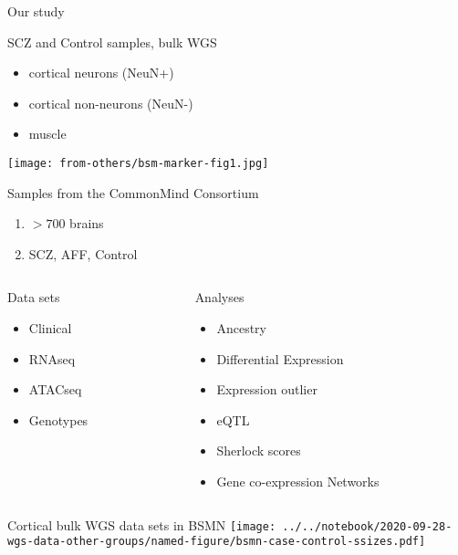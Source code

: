 \documentclass{beamer}
\begin{document}

\begin{frame}{Our study}
\item SCZ and Control samples, bulk WGS
	\begin{itemize}
		\item cortical neurons (NeuN+)
                \item cortical non-neurons (NeuN-)
                \item muscle
	\end{itemize}
\texttt{[image: from-others/bsm-marker-fig1.jpg]}
\end{frame}

\begin{frame}{Samples from the CommonMind Consortium}
\begin{enumerate}
\item \(> 700\) brains
\item SCZ, AFF, Control
\end{enumerate}
\vfill
\begin{columns}[t]
\begin{column}{0.5\textwidth}
Data sets
\begin{itemize}
\item Clinical
\item RNAseq
\item ATACseq
\item Genotypes
\end{itemize}
\end{column}

\begin{column}{0.5\textwidth}
Analyses
\begin{itemize}
\item Ancestry
\item Differential Expression
\item Expression outlier
\item eQTL
\item Sherlock scores
\item Gene co-expression Networks
\end{itemize}
\end{column}
\end{columns}

\end{frame}

\begin{frame}{Cortical bulk WGS data sets in BSMN}
\texttt{[image: ../../notebook/2020-09-28-wgs-data-other-groups/named-figure/bsmn-case-control-ssizes.pdf]}
\end{frame}
\end{document}
